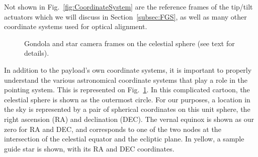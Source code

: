 Not shown in Fig.~\ref{fig:CoordinateSystem} are the reference frames of the tip/tilt actuators which we will discuss in Section~\ref{subsec:FGS}, as well as many other coordinate systems used for optical alignment. 


    
% 	

\begin{figure}[!h]
	\centering
	
	\caption[The celestial sphere]{Gondola and star camera frames on the celestial sphere (see text for details).}
	\label{fig:celestialSphere}
    \end{figure}


In addition to the payload's own coordinate systems, it is important to properly understand the various astronomical coordinate systems that play a role in the pointing system. This is represented on Fig.~\ref{fig:celestialSphere}. In this complicated cartoon, the celestial sphere is shown as the outermost circle. For our purposes, a location in the sky is represented by a pair of spherical coordinates on this unit sphere, the right ascension (RA) and declination (DEC). The vernal equinox is shown as our zero for RA and DEC, and corresponds to one of the two nodes at the intersection of the celestial equator and the ecliptic plane. In yellow, a sample guide star is shown, with its RA and DEC coordinates. 

